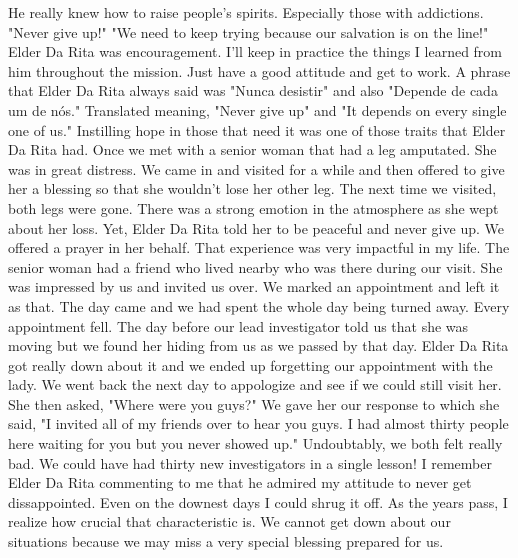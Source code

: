 \begin{entry}
{He really knew how to raise people's spirits.  Especially those with addictions.  "Never give up!"  "We need to keep trying because our salvation is on the line!"  Elder Da Rita was encouragement.  I'll keep in practice the things I learned from him throughout the mission.  Just have a good attitude and get to work.}
{A phrase that Elder Da Rita always said was "Nunca desistir" and also "Depende de cada um de n\'os."  Translated meaning, "Never give up" and "It depends on every single one of us."  Instilling hope in those that need it was one of those traits that Elder Da Rita had. Once we met with a senior woman that had a leg amputated.  She was in great distress.  We came in and visited for a while and then offered to give her a blessing so that she wouldn't lose her other leg.  The next time we visited, both legs were gone.  There was a strong emotion in the atmosphere as she wept about her loss.  Yet, Elder Da Rita told her to be peaceful and never give up.  We offered a prayer in her behalf.  That experience was very impactful in my life.}
{The senior woman had a friend who lived nearby who was there during our visit.  She was impressed by us and invited us over.  We marked an appointment and left it as that.  The day came and we had spent the whole day being turned away.  Every appointment fell.  The day before our lead investigator told us that she was moving but we found her hiding from us as we passed by that day.  Elder Da Rita got really down about it and we ended up forgetting our appointment with the lady.  We went back the next day to appologize and see if we could still visit her.  She then asked, "Where were you guys?"  We gave her our response to which she said, "I invited all of my friends over to hear you guys.  I had almost thirty people here waiting for you but you never showed up."  Undoubtably, we both felt really bad.  We could have had thirty new investigators in a single lesson!  I remember Elder Da Rita commenting to me that he admired my attitude to never get dissappointed.  Even on the downest days I could shrug it off.  As the years pass, I realize how crucial that characteristic is.  We cannot get down about our situations because we may miss a very special blessing prepared for us.} 
\end{entry}

